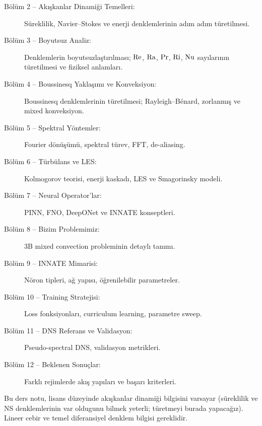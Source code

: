 \begin{description}
    \item[Bölüm 2 -- Akışkanlar Dinamiği Temelleri:] Süreklilik, Navier--Stokes ve enerji denklemlerinin adım adım türetilmesi.

    \item[Bölüm 3 -- Boyutsuz Analiz:] Denklemlerin boyutsuzlaştırılması; $\mathrm{Re}$, $\mathrm{Ra}$, $\mathrm{Pr}$, $\mathrm{Ri}$, $\mathrm{Nu}$ sayılarının türetilmesi ve fiziksel anlamları.

    \item[Bölüm 4 -- Boussinesq Yaklaşımı ve Konveksiyon:] Boussinesq denklemlerinin türetilmesi; Rayleigh--B\'{e}nard, zorlanmış ve mixed konveksiyon.

    \item[Bölüm 5 -- Spektral Yöntemler:] Fourier dönüşümü, spektral türev, FFT, de-aliasing.

    \item[Bölüm 6 -- Türbülans ve LES:] Kolmogorov teorisi, enerji kaskadı, LES ve Smagorinsky modeli.

    \item[Bölüm 7 -- Neural Operator'lar:] PINN, FNO, DeepONet ve INNATE konseptleri.

    \item[Bölüm 8 -- Bizim Problemimiz:] 3B mixed convection probleminin detaylı tanımı.

    \item[Bölüm 9 -- INNATE Mimarisi:] Nöron tipleri, ağ yapısı, öğrenilebilir parametreler.

    \item[Bölüm 10 -- Training Stratejisi:] Loss fonksiyonları, curriculum learning, parametre sweep.

    \item[Bölüm 11 -- DNS Referans ve Validasyon:] Pseudo-spectral DNS, validasyon metrikleri.

    \item[Bölüm 12 -- Beklenen Sonuçlar:] Farklı rejimlerde akış yapıları ve başarı kriterleri.
\end{description}

\begin{remark}
Bu ders notu, lisans düzeyinde akışkanlar dinamiği bilgisini varsayar (süreklilik ve NS denklemlerinin var oldugunu bilmek yeterli; türetmeyi burada yapacağız). Lineer cebir ve temel diferansiyel denklem bilgisi gereklidir.
\end{remark}
